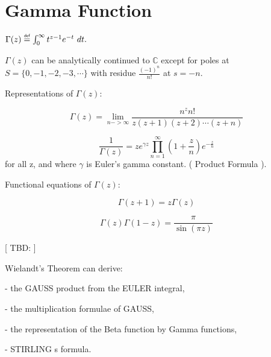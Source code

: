 \newpage

\section{Gamma Function}

$\Gamma(z) \myeq \int_{0}^{\infty} t^{z-1} e^{-t}\ dt .$ 

\noindent $\Gamma(z)$ can be analytically continued to $\mathbb{C}$ except for
poles at $S=\{0, -1, -2, -3, \cdots \}$ with residue $\frac{(-1)^n}{n!}$ at
$s=-n$.

Representations of $\Gamma(z)$:

$$\Gamma(z) = \lim_{n->\infty} \frac{n^{z}n!}{z(z+1)(z+2) \cdots (z+n)}$$

$$\frac{1}{\Gamma(z)} = z e^{\gamma z} \prod_{n=1}^{\infty}
(1+\frac{z}{n})e^{-\frac{z}{n}}$$
for all z, and where $\gamma$ is Euler's gamma constant. ( Product Formula ).

Functional equations of $\Gamma(z)$:

$$\Gamma(z+1) = z \Gamma(z)$$

$$\Gamma(z)\Gamma(1-z) = \frac{\pi}{\sin{(\pi z)}}$$


[ TBD: ]

Wielandt's Theorem can derive:

- the GAUSS product from the EULER integral,

- the multiplication formulae of GAUSS,

- the representation of the Beta function by Gamma functions,

- STIRLING s formula.